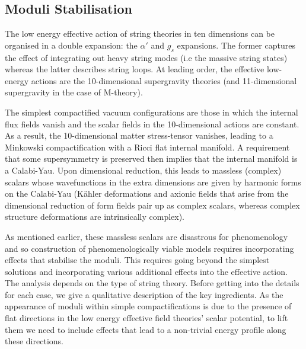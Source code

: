 \subsection{Moduli Stabilisation}
\label{sec:MS}

The low energy effective action of string theories in ten dimensions can be organised in a double expansion: the $\alpha'$ and $g_s$ expansions. The former captures the effect of integrating out heavy string modes (i.e the massive string states) whereas the latter describes string loops. At leading order, the effective low-energy actions are the 10-dimensional supergravity theories (and 11-dimensional supergravity in the case of M-theory). 

The simplest compactified vacuum configurations are those in which the internal flux fields vanish and the scalar fields in the 10-dimensional
actions are constant. As a result, the 10-dimensional matter stress-tensor vanishes, leading to a Minkowski compactification with a Ricci flat internal manifold. A requirement that some supersymmetry is preserved then implies that the internal manifold is a Calabi-Yau. Upon dimensional reduction, this
leads to massless (complex) scalars whose wavefunctions in the extra dimensions are given by harmonic forms on the Calabi-Yau (K\"ahler deformations and axionic fields that arise from the dimensional reduction of form fields pair up as complex scalars, whereas complex structure deformations are intrinsically complex). 

As mentioned earlier, these massless scalars are disastrous for phenomenology and so construction of phenomenologically viable models requires incorporating
effects that stabilise the moduli. This requires going beyond the simplest solutions and incorporating various additional effects into
the  effective action.  The analysis depends on the type of string theory. Before getting into the details for each case, we give
a qualitative description of the key ingredients. As the appearance of moduli within simple compactifications is due to the presence of flat directions in the low energy effective field theories' scalar potential, to lift them we need to include effects that lead to a non-trivial energy profile along these directions.

